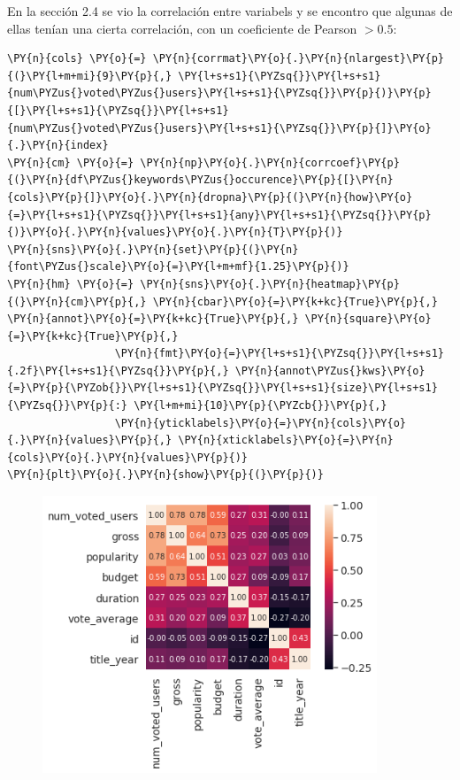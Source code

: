 En la sección 2.4 se vio la correlación entre variabels y se encontro
que algunas de ellas tenían una cierta correlación, con un coeficiente
de Pearson \(>0.5\):

    \begin{tcolorbox}[breakable, size=fbox, boxrule=1pt, pad at break*=1mm,colback=cellbackground, colframe=cellborder]
\begin{Verbatim}[commandchars=\\\{\}]
\PY{n}{cols} \PY{o}{=} \PY{n}{corrmat}\PY{o}{.}\PY{n}{nlargest}\PY{p}{(}\PY{l+m+mi}{9}\PY{p}{,} \PY{l+s+s1}{\PYZsq{}}\PY{l+s+s1}{num\PYZus{}voted\PYZus{}users}\PY{l+s+s1}{\PYZsq{}}\PY{p}{)}\PY{p}{[}\PY{l+s+s1}{\PYZsq{}}\PY{l+s+s1}{num\PYZus{}voted\PYZus{}users}\PY{l+s+s1}{\PYZsq{}}\PY{p}{]}\PY{o}{.}\PY{n}{index}
\PY{n}{cm} \PY{o}{=} \PY{n}{np}\PY{o}{.}\PY{n}{corrcoef}\PY{p}{(}\PY{n}{df\PYZus{}keywords\PYZus{}occurence}\PY{p}{[}\PY{n}{cols}\PY{p}{]}\PY{o}{.}\PY{n}{dropna}\PY{p}{(}\PY{n}{how}\PY{o}{=}\PY{l+s+s1}{\PYZsq{}}\PY{l+s+s1}{any}\PY{l+s+s1}{\PYZsq{}}\PY{p}{)}\PY{o}{.}\PY{n}{values}\PY{o}{.}\PY{n}{T}\PY{p}{)}
\PY{n}{sns}\PY{o}{.}\PY{n}{set}\PY{p}{(}\PY{n}{font\PYZus{}scale}\PY{o}{=}\PY{l+m+mf}{1.25}\PY{p}{)}
\PY{n}{hm} \PY{o}{=} \PY{n}{sns}\PY{o}{.}\PY{n}{heatmap}\PY{p}{(}\PY{n}{cm}\PY{p}{,} \PY{n}{cbar}\PY{o}{=}\PY{k+kc}{True}\PY{p}{,} \PY{n}{annot}\PY{o}{=}\PY{k+kc}{True}\PY{p}{,} \PY{n}{square}\PY{o}{=}\PY{k+kc}{True}\PY{p}{,}
                 \PY{n}{fmt}\PY{o}{=}\PY{l+s+s1}{\PYZsq{}}\PY{l+s+s1}{.2f}\PY{l+s+s1}{\PYZsq{}}\PY{p}{,} \PY{n}{annot\PYZus{}kws}\PY{o}{=}\PY{p}{\PYZob{}}\PY{l+s+s1}{\PYZsq{}}\PY{l+s+s1}{size}\PY{l+s+s1}{\PYZsq{}}\PY{p}{:} \PY{l+m+mi}{10}\PY{p}{\PYZcb{}}\PY{p}{,} 
                 \PY{n}{yticklabels}\PY{o}{=}\PY{n}{cols}\PY{o}{.}\PY{n}{values}\PY{p}{,} \PY{n}{xticklabels}\PY{o}{=}\PY{n}{cols}\PY{o}{.}\PY{n}{values}\PY{p}{)}
\PY{n}{plt}\PY{o}{.}\PY{n}{show}\PY{p}{(}\PY{p}{)}
\end{Verbatim}
\end{tcolorbox}

\begin{figure}[h]
    \centering
    \captionsetup{width=10cm}
    \includegraphics[width=10cm]{./contenido/imagenes/output_80_0.png}

\end{figure}
    { \hspace*{\fill} \\}
    
